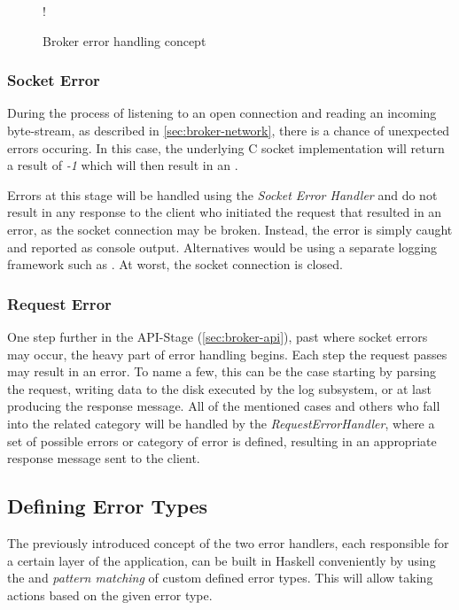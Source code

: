\begin{figure}[H] 
  \centering 
  \resizebox {0.7\linewidth} {!} {
    
  }
  \caption{Broker error handling concept}
  \label{fig:broker-error-activity}
\end{figure}

\subsubsection{Socket Error}

During the process of listening to an open connection and reading an incoming
byte-stream, as described in \ref{sec:broker-network}, there is a chance of
unexpected errors occuring. In this case, the underlying C socket implementation
will return a result of \textit{-1} which will then result in
an . 

Errors at this stage will be handled using the \textit{Socket Error Handler} and
do not result in any response to the client who initiated the request that
resulted in an error, as the socket connection may be broken. Instead, the error
is simply caught and reported as console output. Alternatives would be using a
separate logging framework such as 
. At worst, the
socket connection is closed.

\subsubsection{Request Error}

One step further in the API-Stage (\ref{sec:broker-api}), past where socket
errors may occur, the heavy part of error handling begins. Each step the
request passes may result in an error. To name a few, this can be the case
starting by parsing the request,  writing data to the disk executed by the log
subsystem, or at last producing the response message. All of the mentioned cases
and others who fall into the related category will be handled by the
\textit{RequestErrorHandler}, where a set of possible errors or category of
error is defined, resulting in an appropriate response message sent to the
client.

\subsection{Defining Error Types}

The previously introduced concept of the two error handlers, each responsible
for a certain layer of the application, can be built in Haskell conveniently by
using the 
and \textit{pattern matching} of custom defined error types. This will allow taking
actions based on the given error type.

